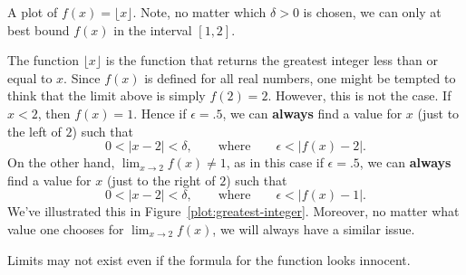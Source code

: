 \begin{marginfigure}[0in]
\caption{A plot of $f(x)=\lfloor x\rfloor$. Note, no matter which
  $\delta>0$ is chosen, we can only at best bound $f(x)$ in the
  interval $[1,2]$.}
\label{plot:greatest-integer}
\end{marginfigure}
\begin{solution}
The function $\lfloor x \rfloor$ is the function that returns the
greatest integer less than or equal to $x$. Since $f(x)$ is defined
for all real numbers, one might be tempted to think that the limit
above is simply $f(2) = 2$. However, this is not the case.  If $x<2$,
then $f(x) =1$. Hence if $\epsilon = .5$, we can \textbf{always} find
a value for $x$ (just to the left of $2$) such that
\[
0< |x -2|< \delta, \qquad\text{where} \qquad \epsilon < |f(x)-2|.
\]
On the other hand, $\lim_{x\to 2} f(x)\ne 1$, as in this case if
$\epsilon=.5$, we can \textbf{always} find a value for $x$ (just to
the right of $2$) such that
\[
0<|x- 2|<\delta, \qquad\text{where} \qquad  \epsilon<|f(x)-1|.
\]
We've illustrated this in
Figure~\ref{plot:greatest-integer}. Moreover, no matter what value one
chooses for $\lim_{x\to 2} f(x)$, we will always have a similar
issue.
\end{solution}



Limits may not exist even if the formula for the function looks
innocent.

